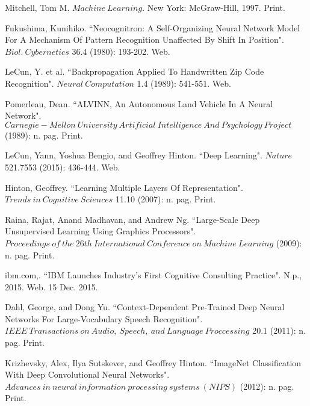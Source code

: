 \documentclass[a4paper]{article}
\begin{document}
\begin{thebibliography}{50}


Mitchell, Tom M. $Machine\ Learning.$ New York: McGraw-Hill, 1997. Print.

Fukushima, Kunihiko. ``Neocognitron: A Self-Organizing Neural Network Model For A Mechanism Of Pattern Recognition Unaffected By Shift In Position". $Biol.\ Cybernetics$ 36.4 (1980): 193-202. Web.

LeCun, Y. et al. ``Backpropagation Applied To Handwritten Zip Code Recognition". $Neural\ Computation$ 1.4 (1989): 541-551. Web.

Pomerleau, Dean. ``ALVINN, An Autonomous Land Vehicle In A Neural Network". $Carnegie-Mellon\ University\ Artificial\ Intelligence\ And\ Psychology\ Project$ (1989): n. pag. Print.

LeCun, Yann, Yoshua Bengio, and Geoffrey Hinton. ``Deep Learning". $Nature$ 521.7553 (2015): 436-444. Web.


Hinton, Geoffrey. ``Learning Multiple Layers Of Representation". $Trends\ in\ Cognitive\ Sciences$ 11.10 (2007): n. pag. Print.

Raina, Rajat, Anand Madhavan, and Andrew Ng. ``Large-Scale Deep Unsupervised Learning Using Graphics Processors". $Proceedings\ of\ the\ 26th\ International\ Conference\ on\ Machine\ Learning$ (2009): n. pag. Print.


ibm.com,. ``IBM Launches Industry’s First Cognitive Consulting Practice". N.p., 2015. Web. 15 Dec. 2015.

Dahl, George, and Dong Yu. ``Context-Dependent Pre-Trained Deep Neural Networks For Large-Vocabulary Speech Recognition". $IEEE\ Transactions\ on\ Audio,\ Speech,\ and\ Language\ Proccessing$ 20.1 (2011): n. pag. Print.

Krizhevsky, Alex, Ilya Sutskever, and Geoffrey Hinton. ``ImageNet Classification With Deep Convolutional Neural Networks". $Advances\ in\ neural\ information\ processing\ systems\ (NIPS)$ (2012): n. pag. Print.

\end{thebibliography}
\end{document}
